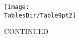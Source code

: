 \hypertarget{Regressions2}{}
\begin{table}[tbp]
  \centerline{\texttt{[image: \\TablesDir/Table9pt2]}}
  \caption{\scriptsize CONTINUED} 
  \label{tab:Regressions2}
\end{table}